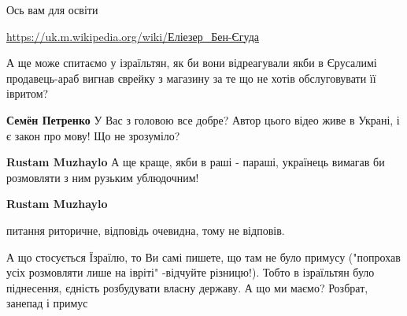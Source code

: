 \begin{itemize}
\begin{itemize}
Ось вам для освіти

\url{https://uk.m.wikipedia.org/wiki/Еліезер_Бен-Єгуда}

 

А ще може спитаємо у ізраїльтян, як би вони відреагували якби в Єрусалимі
продавець-араб вигнав єврейку з магазину за те що не хотів обслуговувати її
івритом?


 
\textbf{Семён Петренко} У Вас з головою все добре? Автор цього відео живе в Украні, і є закон про мову! Що не зрозуміло?

 
\textbf{Rustam Muzhaylo} А ще краще, якби в раші - параші, українець вимагав би розмовляти з ним рузьким ублюдочним!

 
\textbf{Rustam Muzhaylo} 

питання риторичне, відповідь очевидна, тому не відповів.

А що стосується Їзраїлю, то Ви самі пишете, що там не було примусу ("попрохав
усіх розмовляти лише на івріті" -відчуйте різницю!). Тобто в ізраїльтян було
піднесення, єдність розбудувати власну державу. А що ми маємо? Розбрат, занепад
і примус

 

\end{itemize}
\end{itemize}
